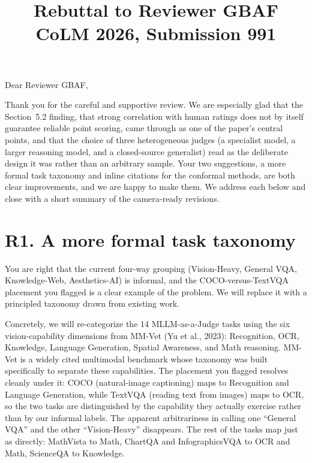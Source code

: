 \documentclass[11pt]{article}
\title{Rebuttal to Reviewer GBAF\\
\large CoLM 2026, Submission 991}
\author{}
\date{}
\begin{document}
\maketitle

Dear Reviewer GBAF,

Thank you for the careful and supportive review. We are especially glad that the Section~5.2 finding, that strong correlation with human ratings does not by itself guarantee reliable point scoring, came through as one of the paper's central points, and that the choice of three heterogeneous judges (a specialist model, a larger reasoning model, and a closed-source generalist) read as the deliberate design it was rather than an arbitrary sample. Your two suggestions, a more formal task taxonomy and inline citations for the conformal methods, are both clear improvements, and we are happy to make them. We address each below and close with a short summary of the camera-ready revisions.

\section*{R1. A more formal task taxonomy}

You are right that the current four-way grouping (Vision-Heavy, General VQA, Knowledge-Web, Aesthetics-AI) is informal, and the COCO-versus-TextVQA placement you flagged is a clear example of the problem. We will replace it with a principled taxonomy drawn from existing work.

Concretely, we will re-categorize the 14 MLLM-as-a-Judge tasks using the six vision-capability dimensions from MM-Vet (Yu et al., 2023): Recognition, OCR, Knowledge, Language Generation, Spatial Awareness, and Math reasoning. MM-Vet is a widely cited multimodal benchmark whose taxonomy was built specifically to separate these capabilities. The placement you flagged resolves cleanly under it: COCO (natural-image captioning) maps to Recognition and Language Generation, while TextVQA (reading text from images) maps to OCR, so the two tasks are distinguished by the capability they actually exercise rather than by our informal labels. The apparent arbitrariness in calling one ``General VQA'' and the other ``Vision-Heavy'' disappears. The rest of the tasks map just as directly: MathVista to Math, ChartQA and InfographicsVQA to OCR and Math, ScienceQA to Knowledge.
\end{document}
